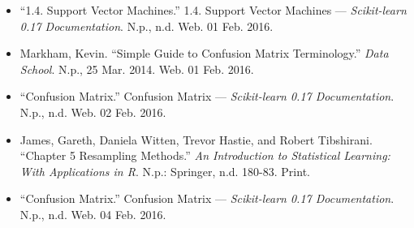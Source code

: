 \documentclass{article}
\begin{document}
\begin{itemize}
\itemsep1pt\parskip0pt
\item
  ``1.4. Support Vector Machines.'' 1.4. Support Vector Machines ---
  \emph{Scikit-learn 0.17 Documentation}. N.p., n.d. Web. 01 Feb. 2016.
\item
  Markham, Kevin. ``Simple Guide to Confusion Matrix Terminology.''
  \emph{Data School}. N.p., 25 Mar. 2014. Web. 01 Feb. 2016.
\item
  ``Confusion Matrix.'' Confusion Matrix --- \emph{Scikit-learn 0.17
  Documentation}. N.p., n.d. Web. 02 Feb. 2016.
\item
  James, Gareth, Daniela Witten, Trevor Hastie, and Robert Tibshirani.
  ``Chapter 5 Resampling Methods.'' \emph{An Introduction to Statistical
  Learning: With Applications in R}. N.p.: Springer, n.d. 180-83. Print.
\item
  ``Confusion Matrix.'' Confusion Matrix --- \emph{Scikit-learn 0.17
  Documentation}. N.p., n.d. Web. 04 Feb. 2016.
\end{itemize}


    
    
    
    
\end{document}
